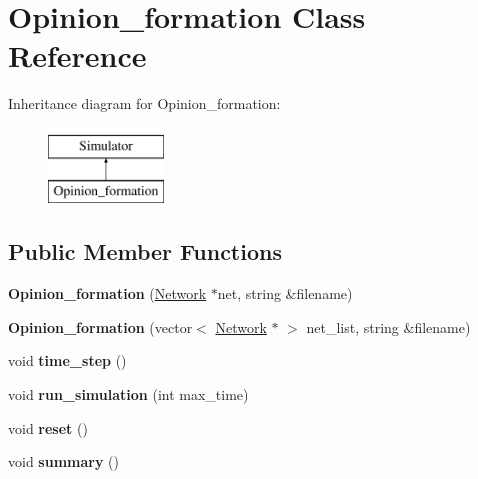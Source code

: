 \hypertarget{classOpinion__formation}{}\section{Opinion\+\_\+formation Class Reference}
\label{classOpinion__formation}
Inheritance diagram for Opinion\+\_\+formation\+:\begin{figure}[H]
\begin{center}
\leavevmode
\includegraphics[height=2.000000cm]{classOpinion__formation}
\end{center}
\end{figure}
\subsection*{Public Member Functions}
\begin{DoxyCompactItemize}
\item 
\hypertarget{classOpinion__formation_a7509661b00bc038cf556ea8b4567f8dd}{}{\bfseries Opinion\+\_\+formation} (\hyperlink{classNetwork}{Network} $\ast$net, string \&filename)\label{classOpinion__formation_a7509661b00bc038cf556ea8b4567f8dd}

\item 
\hypertarget{classOpinion__formation_a0e3f268e479e5804935c19be5bf9adc8}{}{\bfseries Opinion\+\_\+formation} (vector$<$ \hyperlink{classNetwork}{Network} $\ast$ $>$ net\+\_\+list, string \&filename)\label{classOpinion__formation_a0e3f268e479e5804935c19be5bf9adc8}

\item 
\hypertarget{classOpinion__formation_ad3023ef5cec9c16c65d41a9570973ab8}{}void {\bfseries time\+\_\+step} ()\label{classOpinion__formation_ad3023ef5cec9c16c65d41a9570973ab8}

\item 
\hypertarget{classOpinion__formation_a17cd66c91458877408932302acdc5957}{}void {\bfseries run\+\_\+simulation} (int max\+\_\+time)\label{classOpinion__formation_a17cd66c91458877408932302acdc5957}

\item 
\hypertarget{classOpinion__formation_a85de0cfebe9e6d4b7e45daebdd79e7b4}{}void {\bfseries reset} ()\label{classOpinion__formation_a85de0cfebe9e6d4b7e45daebdd79e7b4}

\item 
\hypertarget{classOpinion__formation_a234809db4df362ca24c10dfa222aeb17}{}void {\bfseries summary} ()\label{classOpinion__formation_a234809db4df362ca24c10dfa222aeb17}

\end{DoxyCompactItemize}
